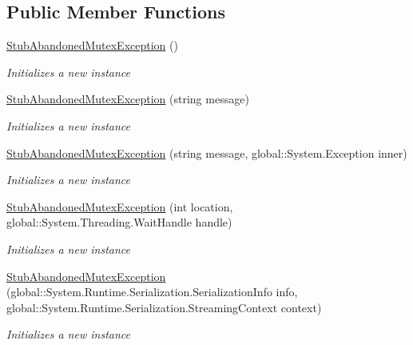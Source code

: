 \subsection*{Public Member Functions}
\begin{DoxyCompactItemize}
\item 
\hyperlink{class_system_1_1_threading_1_1_fakes_1_1_stub_abandoned_mutex_exception_ab00c498be3e5e2f37d0c6970bdb4cffe}{Stub\-Abandoned\-Mutex\-Exception} ()
\begin{DoxyCompactList}\small\item\em Initializes a new instance\end{DoxyCompactList}\item 
\hyperlink{class_system_1_1_threading_1_1_fakes_1_1_stub_abandoned_mutex_exception_a26478d48af10a3c286df15dc10e6a988}{Stub\-Abandoned\-Mutex\-Exception} (string message)
\begin{DoxyCompactList}\small\item\em Initializes a new instance\end{DoxyCompactList}\item 
\hyperlink{class_system_1_1_threading_1_1_fakes_1_1_stub_abandoned_mutex_exception_a3b1e26a78812f5dbb903caca919a2046}{Stub\-Abandoned\-Mutex\-Exception} (string message, global\-::\-System.\-Exception inner)
\begin{DoxyCompactList}\small\item\em Initializes a new instance\end{DoxyCompactList}\item 
\hyperlink{class_system_1_1_threading_1_1_fakes_1_1_stub_abandoned_mutex_exception_afbe3924afd0bbd18a053daa582c902e9}{Stub\-Abandoned\-Mutex\-Exception} (int location, global\-::\-System.\-Threading.\-Wait\-Handle handle)
\begin{DoxyCompactList}\small\item\em Initializes a new instance\end{DoxyCompactList}\item 
\hyperlink{class_system_1_1_threading_1_1_fakes_1_1_stub_abandoned_mutex_exception_a0b3ec0c819aa3ab8120f810e6c62e7bf}{Stub\-Abandoned\-Mutex\-Exception} (global\-::\-System.\-Runtime.\-Serialization.\-Serialization\-Info info, global\-::\-System.\-Runtime.\-Serialization.\-Streaming\-Context context)
\begin{DoxyCompactList}\small\item\em Initializes a new instance\end{DoxyCompactList}\item 

\end{DoxyCompactItemize}
